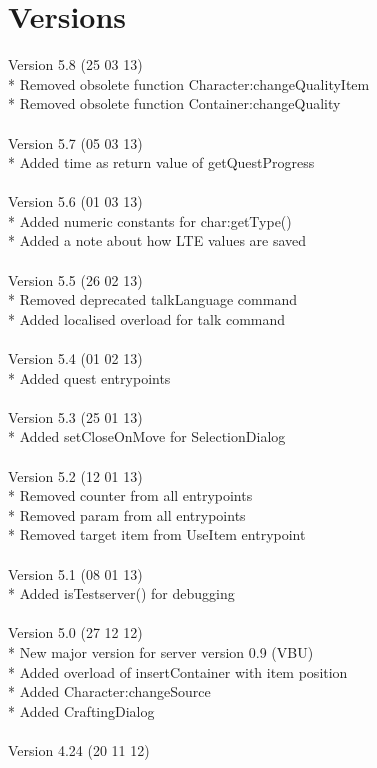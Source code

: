 \documentclass[a4paper,10pt,makeidx]{scrreprt}
\begin{document}
\chapter{Versions}
Version 5.8 (25 03 13)\\
* Removed obsolete function Character:changeQualityItem\\
* Removed obsolete function Container:changeQuality\\
\\
Version 5.7 (05 03 13)\\
* Added time as return value of getQuestProgress\\
\\
Version 5.6 (01 03 13)\\
* Added numeric constants for char:getType()\\
* Added a note about how LTE values are saved\\
\\
Version 5.5 (26 02 13)\\
* Removed deprecated talkLanguage command\\
* Added localised overload for talk command\\
\\
Version 5.4 (01 02 13)\\
* Added quest entrypoints\\
\\
Version 5.3 (25 01 13)\\
* Added setCloseOnMove for SelectionDialog\\
\\
Version 5.2 (12 01 13)\\
* Removed counter from all entrypoints\\
* Removed param from all entrypoints\\
* Removed target item from UseItem entrypoint\\
\\
Version 5.1 (08 01 13)\\
* Added isTestserver() for debugging\\
\\
Version 5.0 (27 12 12)\\
* New major version for server version 0.9 (VBU)\\
* Added overload of insertContainer with item position\\
* Added Character:changeSource\\
* Added CraftingDialog\\
\\
Version 4.24 (20 11 12)\\
\end{document}
